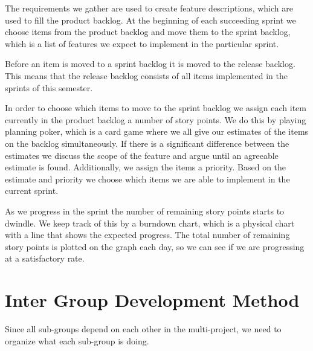 The requirements we gather are used to create feature descriptions, which are used to fill the product backlog.
At the beginning of each succeeding sprint we choose items from the product backlog and move them to the sprint backlog, which is a list of features we expect to implement in the particular sprint.

Before an item is moved to a sprint backlog it is moved to the release backlog.
This means that the release backlog consists of all items implemented in the sprints of this semester.


In order to choose which items to move to the sprint backlog we assign each item currently in the product backlog a number of story points.
We do this by playing planning poker, which is a card game where we all give our estimates of the items on the backlog simultaneously. 
If there is a significant difference between the estimates we discuss the scope of the feature and argue until an agreeable estimate is found.
Additionally, we assign the items a priority.
Based on the estimate and priority we choose which items we are able to implement in the current sprint.

As we progress in the sprint the number of remaining story points starts to dwindle. 
We keep track of this by a burndown chart, which is a physical chart with a line that shows the expected progress.
The total number of remaining story points is plotted on the graph each day, so we can see if we are progressing at a satisfactory rate.

\section{Inter Group Development Method}
Since all sub-groups depend on each other in the multi-project, we need to organize what each sub-group is doing.

